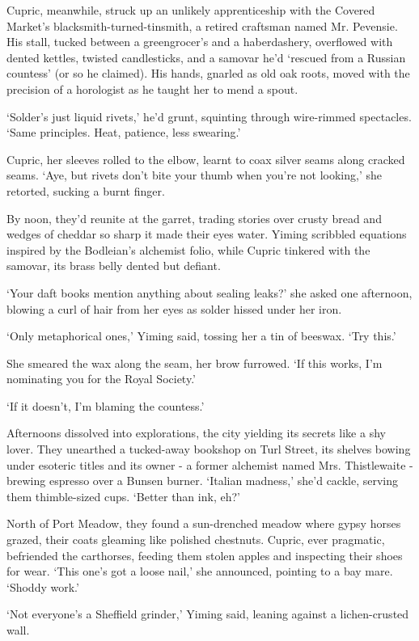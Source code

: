 Cupric, meanwhile, struck up an unlikely apprenticeship with the Covered Market's blacksmith-turned-tinsmith, a retired craftsman named Mr. Pevensie. His stall, tucked between a greengrocer's and a haberdashery, overflowed with dented kettles, twisted candlesticks, and a samovar he'd `rescued from a Russian countess' (or so he claimed). His hands, gnarled as old oak roots, moved with the precision of a horologist as he taught her to mend a spout.

`Solder's just liquid rivets,' he'd grunt, squinting through wire-rimmed spectacles. `Same principles. Heat, patience, less swearing.'

Cupric, her sleeves rolled to the elbow, learnt to coax silver seams along cracked seams. `Aye, but rivets don't bite your thumb when you're not looking,' she retorted, sucking a burnt finger.

By noon, they'd reunite at the garret, trading stories over crusty bread and wedges of cheddar so sharp it made their eyes water. Yiming scribbled equations inspired by the Bodleian's alchemist folio, while Cupric tinkered with the samovar, its brass belly dented but defiant.

`Your daft books mention anything about sealing leaks?' she asked one afternoon, blowing a curl of hair from her eyes as solder hissed under her iron.

`Only metaphorical ones,' Yiming said, tossing her a tin of beeswax. `Try this.'

She smeared the wax along the seam, her brow furrowed. `If this works, I'm nominating you for the Royal Society.'

`If it doesn't, I'm blaming the countess.'

Afternoons dissolved into explorations, the city yielding its secrets like a shy lover. They unearthed a tucked-away bookshop on Turl Street, its shelves bowing under esoteric titles and its owner - a former alchemist named Mrs. Thistlewaite - brewing espresso over a Bunsen burner. `Italian madness,' she'd cackle, serving them thimble-sized cups. `Better than ink, eh?'

North of Port Meadow, they found a sun-drenched meadow where gypsy horses grazed, their coats gleaming like polished chestnuts. Cupric, ever pragmatic, befriended the carthorses, feeding them stolen apples and inspecting their shoes for wear. `This one's got a loose nail,' she announced, pointing to a bay mare. `Shoddy work.'

`Not everyone's a Sheffield grinder,' Yiming said, leaning against a lichen-crusted wall.

